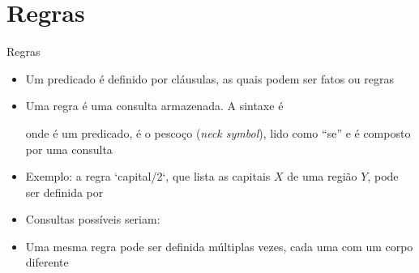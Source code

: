 \section{Regras}

\begin{frame}[fragile]{Regras}

    \begin{itemize}
        \item Um predicado é definido por cláusulas, as quais podem ser fatos ou regras

        \item Uma regra é uma consulta armazenada. A sintaxe é


        onde  é um predicado,  é o pescoço 
        (\textit{neck symbol}), lido como ``se'' e  é composto por uma
        consulta

        \item Exemplo: a regra `capital/2`, que lista as capitais $X$ de uma região $Y$,
            pode ser definida por


        \item Consultas possíveis seriam:


        \item Uma mesma regra pode ser definida múltiplas vezes, cada uma com um corpo diferente

    \end{itemize}

\end{frame}

